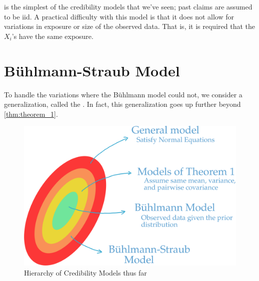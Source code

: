\documentclass[notoc,notitlepage]{tufte-book}
\begin{document}
 is the simplest of the credibility models
that we've seen; past claims are assumed to be iid. A practical difficulty with
this model is that it does not allow for variations in exposure or size of the
observed data. That is, it is required that the $X_i$'s have the same exposure.


\newpage

\section{B\"{u}hlmann-Straub Model}%
\label{sec:buhlmann_straub_model}


To handle the variations where the B\"{u}hlmann model could not,
we consider a generalization, called the .
In fact, this generalization goes up further beyond \cref{thm:theorem_1}.

\begin{figure}[ht]
  \centering
  \includegraphics[width=0.65\linewidth]{images/hierarchy-of-cred-models.png}
  \caption{Hierarchy of Credibility Models thus far}
  \label{fig:hierarchy_of_credibility_models_thus_far}
\end{figure}
\end{document}
